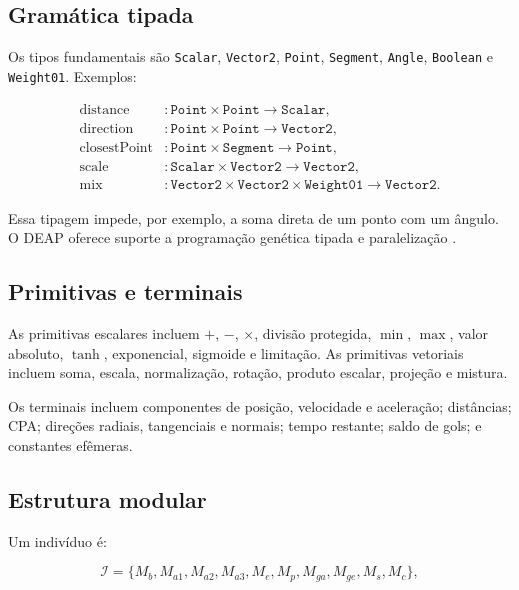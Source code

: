 \documentclass[12pt,a4paper]{article}
\begin{document}
\subsection{Gram\'atica tipada}

Os tipos fundamentais s\~ao \texttt{Scalar}, \texttt{Vector2}, \texttt{Point}, \texttt{Segment}, \texttt{Angle}, \texttt{Boolean} e \texttt{Weight01}. Exemplos:

\begin{align}
  \operatorname{distance}&:\texttt{Point}\times\texttt{Point}\rightarrow\texttt{Scalar},\\
  \operatorname{direction}&:\texttt{Point}\times\texttt{Point}\rightarrow\texttt{Vector2},\\
  \operatorname{closestPoint}&:\texttt{Point}\times\texttt{Segment}\rightarrow\texttt{Point},\\
  \operatorname{scale}&:\texttt{Scalar}\times\texttt{Vector2}\rightarrow\texttt{Vector2},\\
  \operatorname{mix}&:\texttt{Vector2}\times\texttt{Vector2}\times\texttt{Weight01}\rightarrow\texttt{Vector2}.
\end{align}

Essa tipagem impede, por exemplo, a soma direta de um ponto com um \^angulo. O DEAP oferece suporte a programa\c{c}\~ao gen\'etica tipada e paraleliza\c{c}\~ao \cite{deap}.

\subsection{Primitivas e terminais}

As primitivas escalares incluem $+$, $-$, $\times$, divis\~ao protegida, $\min$, $\max$, valor absoluto, $\tanh$, exponencial, sigmoide e limita\c{c}\~ao. As primitivas vetoriais incluem soma, escala, normaliza\c{c}\~ao, rota\c{c}\~ao, produto escalar, proje\c{c}\~ao e mistura.

Os terminais incluem componentes de posi\c{c}\~ao, velocidade e acelera\c{c}\~ao; dist\^ancias; CPA; dire\c{c}\~oes radiais, tangenciais e normais; tempo restante; saldo de gols; e constantes ef\^emeras.

\subsection{Estrutura modular}

Um indiv\'iduo \'e:

\begin{equation}
  \mathcal{I}=\{M_b,M_{a1},M_{a2},M_{a3},M_e,M_p,M_{ga},M_{ge},M_s,M_c\},
\end{equation}
\end{document}

